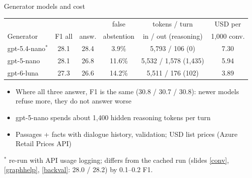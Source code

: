 \documentclass[aspectratio=169,11pt]{beamer}
\newcommand{\gen}{gpt-5.4-nano}
\newcommand{\up}[1]{{\color{green!45!black}#1}}
\begin{document}
\begin{frame}{Generator models and cost}
\centering
\footnotesize
\begin{tabular}{lccccc}
\toprule
 & & & false & tokens / turn & USD per \\
Generator & F1 all & answ. & abstention & in / out (reasoning) & 1,000 conv. \\
\midrule
\gen{}$^{*}$ & 28.1 & \up{28.4} & 3.9\% & 5,793 / 106 (0) & 7.30 \\ %
gpt-5-nano & 28.1 & 26.8 & 11.6\% & 5,532 / 1,578 (1,435) & 5.94 \\ %
gpt-6-luna & 27.3 & 26.6 & 14.2\% & 5,511 / 176 (102) & 3.89 \\ %
\bottomrule
\end{tabular}

\vspace{4mm}
\begin{itemize}
\item Where all three answer, F1 is the same (30.8 / 30.7 / 30.8): newer models refuse more, they do not answer worse %
\item gpt-5-nano spends about 1,400 hidden reasoning tokens per turn %
\item Passages + facts with dialogue history, validation; USD list prices (Azure Retail Prices API) %
\end{itemize}

\vspace{1mm}
{\scriptsize $^{*}$ re-run with API usage logging; differs from the cached run (slides \ref{conv}, \ref{graphhelp}, \ref{backval}: 28.0 / 28.2) by 0.1--0.2 F1.}
\end{frame}
\end{document}
